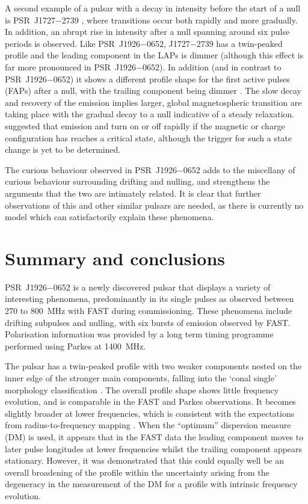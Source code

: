A second example of a pulsar with a decay in intensity before the start of a null is PSR~J1727$-$2739 \citep{WWY+2016}, where transitions occur both rapidly and more gradually. In addition, an abrupt rise in intensity after a null spanning around six pulse periods is observed. Like PSR~J1926$-$0652, J1727$-$2739 has a twin-peaked profile and the leading component in the LAPs is dimmer (although this effect is far more pronounced in PSR~J1926$-$0652). In addition (and in contrast to PSR~J1926$-$0652) it shows a different profile shape for the first active pulses (FAPs) after a null, with the trailing component being dimmer \citep{WWY+2016}. The slow decay and recovery of the emission implies larger, global magnetospheric transition are taking place \citep{LHK+2010,MYxx2014} with the gradual decay to a null indicative of a steady relaxation. \citet{WMJx2007} suggested that emission and turn on or off rapidly if the magnetic or charge configuration has reaches a critical state, although the trigger for such a state change is yet to be determined.

The curious behaviour observed in PSR~J1926$-$0652 adds to the miscellany of curious behaviour surrounding drifting and nulling, and strengthens the arguments that the two are intimately related. It is clear that further observations of this and other similar pulsars are needed, as there is currently no model which can satisfactorily explain these phenomena.




\section{Summary and conclusions}
\label{sec: J1926 - conclusions}


PSR~J1926$-$0652 is a newly discovered pulsar that displays a variety of interesting phenomena, predominantly in its single pulses as observed between 270 to 800~MHz with FAST during commissioning. These phenomena include drifting subpulses and nulling, with six bursts of emission observed by FAST. Polarisation information was provided by a long term timing programme performed using Parkes at 1400~MHz.

The pulsar has a twin-peaked profile with two weaker components nested on the inner edge of the stronger main components, falling into the `conal single' morphology classification \citep{Rxxx1983a,Rxxx1993}. The overall profile shape shows little frequency evolution, and is comparable in the FAST and Parkes observations. It becomes slightly broader at lower frequencies, which is consistent with the expectations from radius-to-frequency mapping \citep[e.g.][]{Cxxx1978}. When the ``optimum'' dispersion measure (DM) is used, it appears that in the FAST data the leading component moves to later pulse longitudes at lower frequencies whilst the trailing component appears stationary. However, it was demonstrated that this could equally well be an overall broadening of the profile within the uncertainty arising from the degeneracy in the measurement of the DM for a profile with intrinsic frequency evolution.

